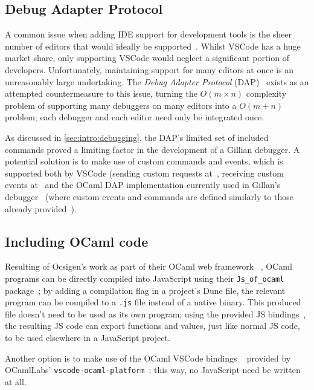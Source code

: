 
\subsection{Debug Adapter Protocol}
A common issue when adding IDE support for development tools is the sheer
number of editors that would ideally be supported~\cite{magpiebridge}. Whilst
VSCode has a huge market share, only supporting VSCode would neglect a
significant portion of developers. Unfortunately, maintaining support for many
editors at once is an unreasonably large undertaking. The \textit{Debug Adapter
Protocol} (DAP)~\cite{dap} exists as an attempted countermeasure to this issue,
turning the $O(m \times n)$ complexity problem of supporting many debuggers on
many editors into a $O(m + n)$ problem; each debugger and each editor need only
be integrated once.


As discussed in \autoref{sec:intro:debugging}, the DAP's limited set of
included commands proved a limiting factor in the development of a Gillian
debugger. A potential solution is to make use of custom commands and events,
which is supported both by VSCode (sending custom requests at~\cite{vscode-dap-custom-request}, receiving custom events at~\cite{vscode-dap-custom-event} and the OCaml DAP
implementation currently used in Gillan's debugger~\cite{ocaml-dap} (where
custom events and commands are defined similarly to those already
provided~\cite{ocaml-dap-custom}).


\subsection{Including OCaml code}

Resulting of Ocsigen's work as part of their OCaml web framework
~\cite{ocsigen-framework}, OCaml programs can be directly compiled into
JavaScript using their \texttt{Js\_of\_ocaml} package~\cite{js-of-ocaml}; by
adding a compilation flag in a project's Dune file, the relevant program can be
compiled to a \texttt{.js} file instead of a native binary. This produced file
doesn't need to be used as its own program; using the provided JS
bindings~\cite{js-of-ocaml-bindings}, the resulting JS code can export
functions and values, just like normal JS code, to be used elsewhere in a
JavaScript project.

Another option is to make use of the OCaml VSCode bindings
~\cite{vscode-ocaml-bindings} provided by OCamlLabs'
\texttt{vscode-ocaml-platform}~\cite{vscode-ocaml-platform, ocamllabs}; this
way, no JavaScript need be written at all.

